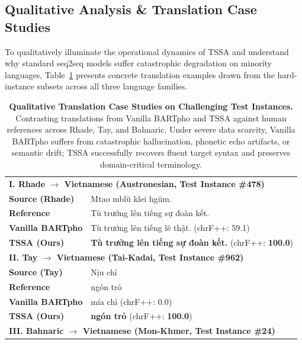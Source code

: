 \documentclass[11pt,a4paper]{article}
\begin{document}
\subsection{Qualitative Analysis \& Translation Case Studies}
\label{sec:qualitative_analysis}

To qualitatively illuminate the operational dynamics of TSSA and understand why standard seq2seq models suffer catastrophic degradation on minority languages, Table~\ref{tab:qualitative_examples} presents concrete translation examples drawn from the hard-instance subsets across all three language families.

\begin{table}[htbp]
\centering\small
{}\selectfont
\caption{\textbf{Qualitative Translation Case Studies on Challenging Test Instances.} Contrasting translations from Vanilla BARTpho and TSSA against human references across Rhade, Tay, and Bahnaric. Under severe data scarcity, Vanilla BARTpho suffers from catastrophic hallucination, phonetic echo artifacts, or semantic drift; TSSA successfully recovers fluent target syntax and preserves domain-critical terminology.}
\label{tab:qualitative_examples}
\vspace{4pt}
\begin{tabular}{p{}p{}}
\toprule
\multicolumn{2}{l}{\textbf{I. Rhade $\rightarrow$ Vietnamese (Austronesian, Test Instance \#478)}} \\
\textbf{Source (Rhade)} & Mtao mbl\u{u} klei hg\u{u}m. \\
\textbf{Reference} & Tù trưởng lên tiếng sự đoàn kết. \\
\textbf{Vanilla BARTpho} & \textcolor{red!80!black}{Tù trưởng lên tiếng lẽ thật.} (chrF++: 59.1) \\
\textbf{TSSA (Ours)} & \textcolor{topgreen}{\textbf{Tù trưởng lên tiếng sự đoàn kết.}} (chrF++: \textbf{100.0}) \\
\midrule
\multicolumn{2}{l}{\textbf{II. Tay $\rightarrow$ Vietnamese (Tai-Kadai, Test Instance \#962)}} \\
\textbf{Source (Tay)} & Nịu chỉ \\
\textbf{Reference} & ngón trỏ \\
\textbf{Vanilla BARTpho} & \textcolor{red!80!black}{mía chỉ} (chrF++: 0.0) \\
\textbf{TSSA (Ours)} & \textcolor{topgreen}{\textbf{ngón trỏ}} (chrF++: \textbf{100.0}) \\
\midrule
\multicolumn{2}{l}{\textbf{III. Bahnaric $\rightarrow$ Vietnamese (Mon-Khmer, Test Instance \#24)}} \\

\end{tabular}
\end{table}
\end{document}
